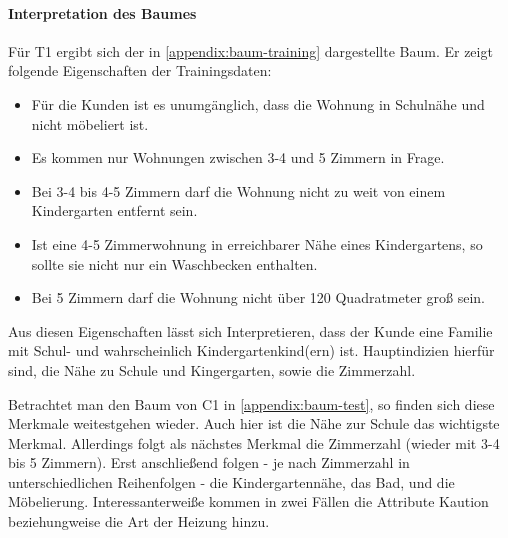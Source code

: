 \paragraph{Interpretation des Baumes}
Für T1 ergibt sich der in \autoref{appendix:baum-training} dargestellte Baum.
Er zeigt folgende Eigenschaften der Trainingsdaten:
\begin{itemize}
    \item Für die Kunden ist es unumgänglich, dass die Wohnung in Schulnähe und nicht möbeliert ist.
    \item Es kommen nur Wohnungen zwischen 3-4 und 5 Zimmern in Frage.
    \item Bei 3-4 bis 4-5 Zimmern darf die Wohnung nicht zu weit von einem Kindergarten entfernt sein.
    \item Ist eine 4-5 Zimmerwohnung in erreichbarer Nähe eines Kindergartens, so sollte sie nicht nur ein Waschbecken enthalten.
    \item Bei 5 Zimmern darf die Wohnung nicht über 120 Quadratmeter groß sein.
\end{itemize}

Aus diesen Eigenschaften lässt sich Interpretieren,
dass der Kunde eine Familie mit Schul- und wahrscheinlich Kindergartenkind(ern) ist.
Hauptindizien hierfür sind, die Nähe zu Schule und Kingergarten, sowie die Zimmerzahl.


Betrachtet man den Baum von C1 in \autoref{appendix:baum-test},
so finden sich diese Merkmale weitestgehen wieder.
Auch hier ist die Nähe zur Schule das wichtigste Merkmal.
Allerdings folgt als nächstes Merkmal die Zimmerzahl (wieder mit 3-4 bis 5 Zimmern).
Erst anschließend folgen - je nach Zimmerzahl in unterschiedlichen Reihenfolgen - die Kindergartennähe,
das Bad, und die Möbelierung.
Interessanterweiße kommen in zwei Fällen die Attribute Kaution beziehungweise die Art der Heizung hinzu.
